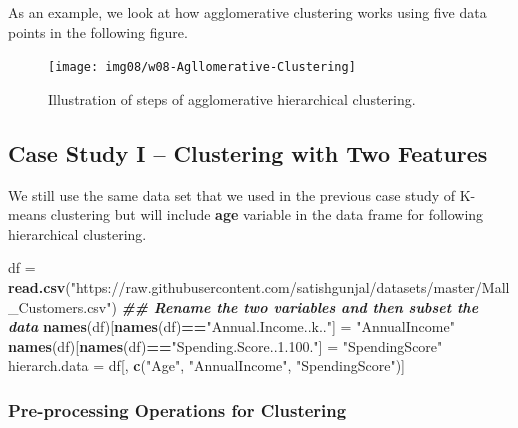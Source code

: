\documentclass[
]{book}
\newenvironment{Shaded}{\begin{snugshade}}{\end{snugshade}}
\newcommand{\DocumentationTok}[1]{\textcolor[rgb]{0.56,0.35,0.01}{\textbf{\textit{#1}}}}
\newcommand{\FunctionTok}[1]{\textcolor[rgb]{0.13,0.29,0.53}{\textbf{#1}}}
\newcommand{\NormalTok}[1]{#1}
\newcommand{\OtherTok}[1]{\textcolor[rgb]{0.56,0.35,0.01}{#1}}
\newcommand{\SpecialCharTok}[1]{\textcolor[rgb]{0.81,0.36,0.00}{\textbf{#1}}}
\newcommand{\StringTok}[1]{\textcolor[rgb]{0.31,0.60,0.02}{#1}}
\begin{document}
As an example, we look at how agglomerative clustering works using five data points in the following figure.

\begin{figure}

{\centering \texttt{[image: img08/w08-Agllomerative-Clustering]} 

}

\caption{Illustration of steps of agglomerative hierarchical clustering.}\label{fig:unnamed-chunk-200}
\end{figure}

\hfill\break

\hypertarget{case-study-i-clustering-with-two-features}{%
\subsection{Case Study I -- Clustering with Two Features}\label{case-study-i-clustering-with-two-features}}

We still use the same data set that we used in the previous case study of K-means clustering but will include \textbf{age} variable in the data frame for following hierarchical clustering.

\begin{Shaded}
\begin{Highlighting}[]
\NormalTok{df }\OtherTok{=} \FunctionTok{read.csv}\NormalTok{(}\StringTok{"https://raw.githubusercontent.com/satishgunjal/datasets/master/Mall\_Customers.csv"}\NormalTok{)}
\DocumentationTok{\#\# Rename the two variables and then subset the data}
\FunctionTok{names}\NormalTok{(df)[}\FunctionTok{names}\NormalTok{(df)}\SpecialCharTok{==}\StringTok{"Annual.Income..k.."}\NormalTok{] }\OtherTok{=} \StringTok{"AnnualIncome"}
\FunctionTok{names}\NormalTok{(df)[}\FunctionTok{names}\NormalTok{(df)}\SpecialCharTok{==}\StringTok{"Spending.Score..1.100."}\NormalTok{] }\OtherTok{=} \StringTok{"SpendingScore"}
\NormalTok{hierarch.data }\OtherTok{=}\NormalTok{ df[, }\FunctionTok{c}\NormalTok{(}\StringTok{"Age"}\NormalTok{, }\StringTok{"AnnualIncome"}\NormalTok{, }\StringTok{"SpendingScore"}\NormalTok{)]}
\end{Highlighting}
\end{Shaded}

\hfill\break

\hypertarget{pre-processing-operations-for-clustering}{%
\subsubsection{Pre-processing Operations for Clustering}\label{pre-processing-operations-for-clustering}}
\end{document}
